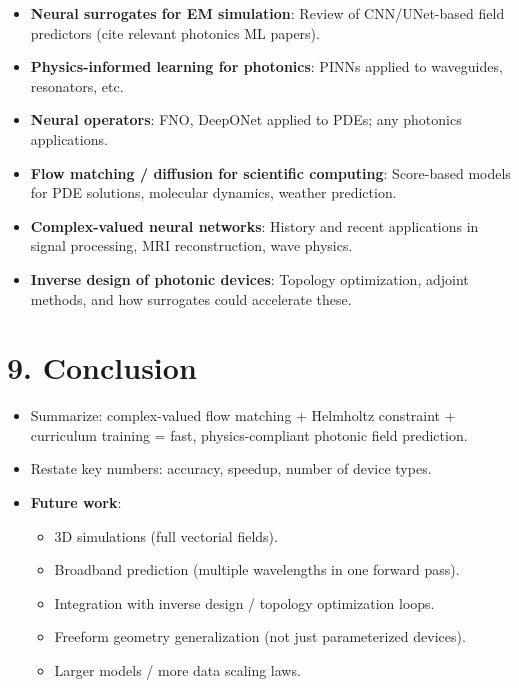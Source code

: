 \documentclass[11pt,letterpaper]{article}
\begin{document}
\begin{itemize}
    \item \textbf{Neural surrogates for EM simulation}: Review of CNN/UNet-based field predictors (cite relevant photonics ML papers).
    \item \textbf{Physics-informed learning for photonics}: PINNs applied to waveguides, resonators, etc.
    \item \textbf{Neural operators}: FNO, DeepONet applied to PDEs; any photonics applications.
    \item \textbf{Flow matching / diffusion for scientific computing}: Score-based models for PDE solutions, molecular dynamics, weather prediction.
    \item \textbf{Complex-valued neural networks}: History and recent applications in signal processing, MRI reconstruction, wave physics.
    \item \textbf{Inverse design of photonic devices}: Topology optimization, adjoint methods, and how surrogates could accelerate these.
\end{itemize}

\section{9. Conclusion}

\begin{itemize}
    \item Summarize: complex-valued flow matching + Helmholtz constraint + curriculum training = fast, physics-compliant photonic field prediction.
    \item Restate key numbers: accuracy, speedup, number of device types.
    \item \textbf{Future work}:
    \begin{itemize}
        \item 3D simulations (full vectorial fields).
        \item Broadband prediction (multiple wavelengths in one forward pass).
        \item Integration with inverse design / topology optimization loops.
        \item Freeform geometry generalization (not just parameterized devices).
        \item Larger models / more data scaling laws.
    \end{itemize}
\end{itemize}
\end{document}
